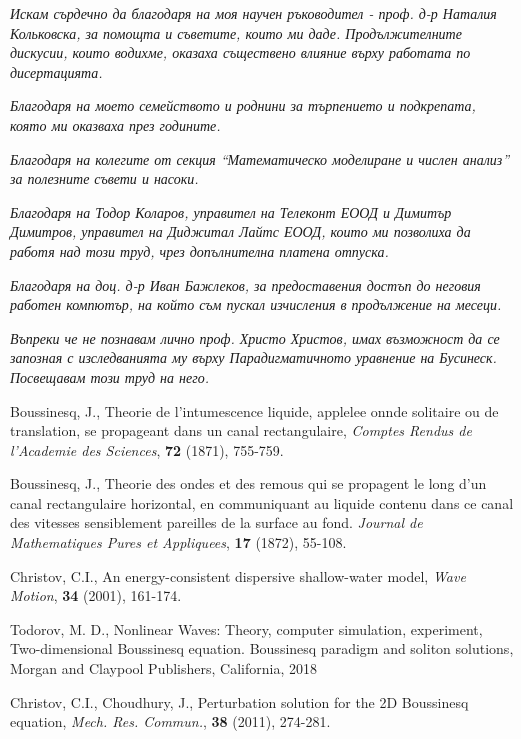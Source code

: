 \documentclass[a4paper]{article}
\theoremstyle{remark}
\begin{document}
\begin{large}
{\Large \it Искам сърдечно да благодаря на моя научен ръководител - проф. д-р Наталия Кольковска, за помощта и съветите, които ми даде. Продължителните дискусии, които водихме, оказаха съществено влияние върху работата по дисертацията.}

{\Large \it Благодаря на моето семейството и роднини за търпението и подкрепата, която ми оказваха през годините.}

{\Large \it Благодаря на колегите от секция ``Математическо моделиране и числен анализ'' за полезните съвети и насоки.}

{\Large \it Благодаря на Тодор Коларов, управител на Телеконт ЕООД и Димитър Димитров, управител на Диджитал Лайтс ЕООД, които ми позволиха да работя над този труд, чрез допълнителна платена отпуска.}

{\Large \it Благодаря на доц. д-р Иван Бажлеков, за предоставения достъп до неговия работен компютър, на който съм пускал изчисления в продължение на месеци.}

\vspace{8cm}

{\Large \it Въпреки че не познавам лично проф. Христо Христов, имах възможност да се запозная с  изследванията му върху Парадигматичното уравнение на Бусинеск. Посвещавам този труд на него. }

\newpage
\begin{thebibliography}{99}

	 Boussinesq, J., Theorie de l'intumescence liquide, applelee onnde solitaire ou de translation, se propageant dans un canal rectangulaire, {\it Comptes Rendus de l'Academie des Sciences}, \textbf{72} (1871), 755-759.

	 Boussinesq, J., Theorie des ondes et des remous qui se propagent le long d'un canal rectangulaire horizontal, en communiquant au liquide contenu dans ce canal des vitesses sensiblement pareilles de la surface au fond.  {\it Journal de Mathematiques Pures et Appliquees}, \textbf{17} (1872), 55-108.

	 Christov, C.I., An energy-consistent dispersive shallow-water model,  {\it Wave Motion}, \textbf{34} (2001), 161-174.

	 Todorov, M. D., Nonlinear Waves: Theory, computer simulation, experiment, Two-dimensional Boussinesq equation. Boussinesq paradigm and soliton solutions, Morgan and Claypool Publishers, California, 2018

	 Christov, C.I., Choudhury, J., Perturbation solution for the 2D Boussinesq equation, {\it Mech. Res. Commun.}, \textbf{38} (2011), 274-281.


\end{thebibliography}
\end{large}
\end{document}
